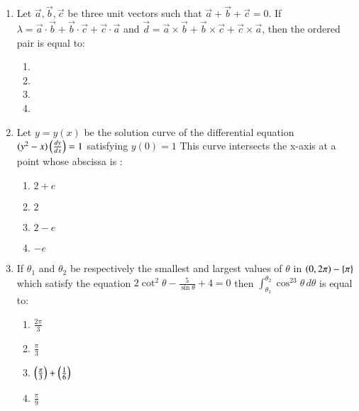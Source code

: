\documentclass[journal,12pt,twocolumn]{IEEEtran}
\theoremstyle{remark}
\begin{document}
\begin{enumerate}
    \item Let $\vec{a},\vec{b},\vec{c}$ be three unit vectors such that $\overrightarrow{a}+\overrightarrow{b}+\overrightarrow{c}=0$. If $\lambda=\overrightarrow{a}\cdot\overrightarrow{b}+\overrightarrow{b}\cdot\overrightarrow{c}+\overrightarrow{c}\cdot\overrightarrow{a}$ and $\overrightarrow{d}=\overrightarrow{a}\times\overrightarrow{b}+\overrightarrow{b}\times\overrightarrow{c}+\overrightarrow{c}\times\overrightarrow{a}$, then the ordered pair  is equal to: 
        \begin{enumerate}
            \item {}
            \item {}
            \item {}
            \item {}
        \end{enumerate}

    \item Let $y=y(x)$ be the solution curve of the differential equation $(y^2-x)\left(\frac{dy}{dx}\right)=1$ satisfying $y(0)=1$ This curve intersects the x-axis at a point whose abscissa is :
        \begin{enumerate}
            \item $2+e$
            \item $2$
            \item $2-e$
            \item $-e$
        \end{enumerate}

    \item If $\theta_1$ and $\theta_2$ be respectively the smallest and largest values of $\theta$ in $\left(0,2\pi\right)-\left\{\pi\right\}$ which satisfy the equation $2\cot^2\theta-\frac{5}{\sin\theta}+4=0$ then $\int_{\theta_1}^{\theta_2}\cos^23\theta\,d\theta$ is equal to:
        \begin{enumerate}
            \item $\frac{2\pi}{3}$
            \item $\frac{\pi}{3}$
            \item $\left(\frac{\pi}{3}\right)+\left(\frac{1}{6}\right)$
            \item $\frac{\pi}{9}$
        \end{enumerate}

\end{enumerate}
\end{document}
